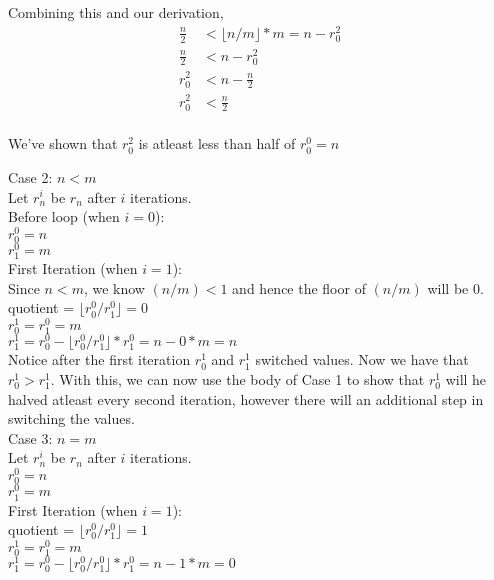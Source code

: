 \documentclass{article}
\newcommand{\floor}[1]{\lfloor #1 \rfloor}
\begin{document}
\begin{enumerate}
	Combining this and our derivation, 
	\begin{align*}
	\frac{n}{2} &< \floor{n/m} * m =  n - r_0^2\\
	\frac{n}{2} &< n - r_0^2\\
	r_0^2 &< n - \frac{n}{2}\\
	r_0^2 &< \frac{n}{2}\\
	\end{align*}
	
	We've shown that $r_0^2$ is atleast less than half of $r_0^0 = n$
	
	Case 2: $n < m$\\
	Let $r_n^i$ be $r_n$ after $i$ iterations.\\
	 
	Before loop (when $i = 0$):\\
	$r_0^0 = n$\\
	$r_1^0 = m$\\
	
	First Iteration (when $i = 1$):\\ 
	Since $n < m$, we know $(n/m) < 1$ and hence the floor of $(n/m)$ will be 0.\\
	
	quotient = $\floor{r_0^0 / r_1^0} = 0 $\\
	$r_0^1 = r_1^0 = m$\\
	$r_1^1 = r_0^0 - \floor{r_0^0 / r_1^0} * r_1^0 = n - 0 * m = n $\\
	
	Notice after the first iteration $r_0^1$ and $r_1^1$ switched values. Now we have that $r_0^1 > r_1^1$. With this, we can now use the body of Case 1 to show that $r_0^1$ will he halved atleast every second iteration, however there will an additional step in switching the values.\\
	
	Case 3: $n = m$\\
	Let $r_n^i$ be $r_n$ after $i$ iterations.\\
	
	$r_0^0 = n$\\
	$r_1^0 = m$\\
	 
	First Iteration (when $i = 1$):\\
	quotient = $\floor{r_0^0 / r_1^0} = 1$\\
	$r_0^1 = r_1^0 = m$\\
	$r_1^1 = r_0^0 - \floor{r_0^0 / r_1^0} * r_1^0 = n - 1 * m = 0$\\
	

\end{enumerate}
\end{document}
